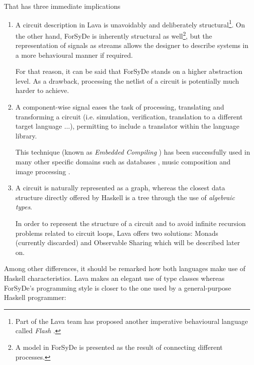That has three immediate implications

\begin{enumerate}[1)]
\item A circuit description in Lava is unavoidably and deliberately
  structural\footnote{Part of the Lava team has proposed another imperative
    behavioural language called \textit{Flash} \cite{flash}.}. On the
  other hand, ForSyDe is inherently structural as well\footnote{A
    model in ForSyDe is presented as the result of connecting
    different processes.}, but the representation of signals as
  streams allows the designer to describe systems in a more behavioural
  manner if required.

  For that reason, it can be said that ForSyDe stands on a higher
  abstraction level. As a drawback, processing the netlist of a
  circuit is potentially much harder to achieve.
  
\item A component-wise signal eases the task of processing,
  translating and transforming a circuit (i.e. simulation,
  verification, translation to a different target language $\dots$),
  permitting to include a translator within the language library.

  This technique (known as \textit{Embedded Compiling} \cite{building})
  has been successfully used in many other specific domains such as
  databases \cite{dsec:db}, music composition \cite{haskore} and image
  processing \cite{dsec:graphics}.
  

\item A circuit is naturally represented as a graph, whereas the closest
  data structure directly offered by Haskell is a tree through the use of
  \textit{algebraic types}.
  
  In order to represent the structure of a circuit and to avoid
  infinite recursion problems related to circuit loops, Lava offers
  two solutions: Monads (currently discarded) and Observable Sharing which
  will be described later on.
\end{enumerate}

Among other differences, it should be remarked how both languages make
use of Haskell characteristics. Lava makes an elegant use of type
classes whereas ForSyDe's programming style is closer to the one used by a
general-purpose Haskell programmer:

